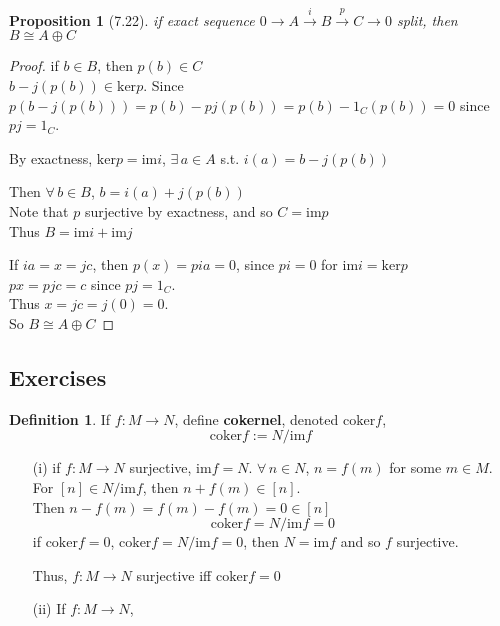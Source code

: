 \documentclass[twoside,landscape]{amsart}
\theoremstyle{plain}
\newtheorem{proposition}{Proposition}
\theoremstyle{definition}
\newtheorem{definition}{Definition}
\theoremstyle{remark}
\newcommand{\exercisehead}[1]
  { \smallskip
   \noindent{\small\bf Exercise #1.}
  }
\begin{document}
\begin{multicols*}{2}
\begin{proposition}[7.22]
  if exact sequence $0 \to A \xrightarrow{i} B \xrightarrow{p} C \to 0$ split, then $B \cong A \oplus C$  
\end{proposition}

\begin{proof}
  if $b \in B$, then $p(b) \in C$ \\
$b - j(p(b)) \in \text{ker}p$.  Since $p(b-j(p(b))) = p(b) - pj(p(b)) = p(b) -1_C(p(b)) = 0$ since $pj=1_C$.  

By exactness, $\text{ker}p = \text{im}i$, $\exists \, a \in A$ s.t. $i(a) = b-j(p(b))$

Then $\forall \, b \in B$, $b=i(a) + j(p(b))$ \\
\phantom{Then} Note that $p$ surjective by exactness, and so $C = \text{im}p$ \\
Thus $B = \text{im}i + \text{im}j$

If $ia=x=jc$, then $p(x) = pia=0$, since $pi =0$ for $\text{im}i = \text{ker}p$ \\
\phantom{if} $px=pjc =c$ since $pj=1_C$.  \\
Thus $x=jc = j(0) =0$.  \\
So $B \cong A\oplus C$
\end{proof}

\subsection*{Exercises}

\begin{definition}
If $f: M \to N$, define \textbf{cokernel}, denoted $\text{coker}f$, 
\begin{equation}
  \text{coker}f := N/ \text{im}f
\end{equation}
\end{definition}

\exercisehead{7.13} 
\begin{enumerate}
\item[(i)] if $f:M \to N$ surjective, $\text{im}f =N$.  $\forall \, n \in N$, $n=f(m)$ for some $m\in M$.  \\
For $[n] \in N/\text{im}f$, then $n+f(m) \in [n]$.  \\
\phantom{For } Then $n-f(m) = f(m) -f(m) = 0 \in [n]$
\[
\text{coker}f = N/\text{im}f = 0
\]
if $\text{coker}f =0$, $\text{coker}f = N/\text{im}f =0$, then $N=\text{im}f$ and so $f$ surjective.  

Thus, $f:M\to N$ surjective iff $\text{coker}f=0$
\item[(ii)] If $f:M\to N$, 


\end{enumerate}
\end{multicols*}
\end{document}
